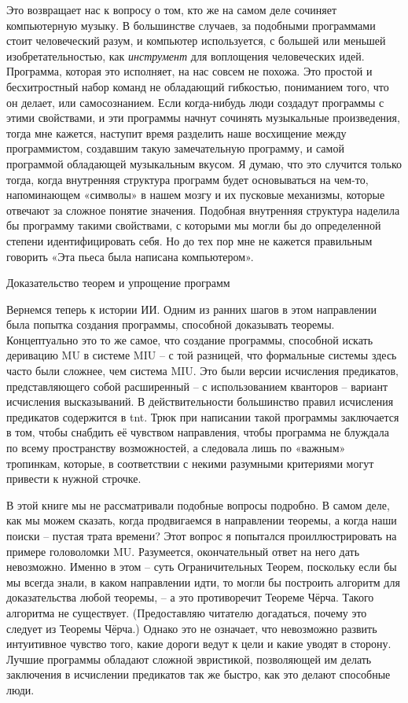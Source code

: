 \documentclass[../main.tex]{subfiles}
\begin{document}
Это возвращает нас к вопросу о том, кто же на самом деле сочиняет компьютерную музыку. В большинстве случаев, за подобными программами стоит человеческий разум, и компьютер используется, с большей или меньшей изобретательностью, как \emph{инструмент} для воплощения человеческих идей. Программа, которая это исполняет, на нас совсем не похожа. Это простой и бесхитростный набор команд не обладающий гибкостью, пониманием того, что он делает, или самосознанием. Если когда-нибудь люди создадут программы с этими свойствами, и эти программы начнут сочинять музыкальные произведения, тогда мне кажется, наступит время разделить наше восхищение между программистом, создавшим такую замечательную программу, и самой программой обладающей музыкальным вкусом. Я думаю, что это случится только тогда, когда внутренняя структура программ будет основываться на чем-то, напоминающем «символы» в нашем мозгу и их пусковые механизмы, которые отвечают за сложное понятие значения. Подобная внутренняя структура наделила бы программу такими свойствами, с которыми мы могли бы до определенной степени идентифицировать себя. Но до тех пор мне не кажется правильным говорить «Эта пьеса была написана компьютером».

Доказательство теорем и упрощение программ

Вернемся теперь к истории ИИ\@. Одним из ранних шагов в этом направлении была попытка создания программы, способной доказывать теоремы. Концептуально это то же самое, что создание программы, способной искать деривацию MU в системе MIU \--- с той разницей, что формальные системы здесь часто были сложнее, чем система MIU\@. Это были версии исчисления предикатов, представляющего собой расширенный \--- с использованием кванторов \--- вариант исчисления высказываний. В действительности большинство правил исчисления предикатов содержится в \acs{tnt}\@. Трюк при написании такой программы заключается в том, чтобы снабдить её чувством направления, чтобы программа не блуждала по всему пространству возможностей, а следовала лишь по «важным» тропинкам, которые, в соответствии с некими разумными критериями могут привести к нужной строчке.

В этой книге мы не рассматривали подобные вопросы подробно. В самом деле, как мы можем сказать, когда продвигаемся в направлении теоремы, а когда наши поиски \--- пустая трата времени? Этот вопрос я попытался проиллюстрировать на примере головоломки MU\@. Разумеется, окончательный ответ на него дать невозможно. Именно в этом \--- суть Ограничительных Теорем, поскольку если бы мы всегда знали, в каком направлении идти, то могли бы построить алгоритм для доказательства любой теоремы, \--- а это противоречит Теореме Чёрча. Такого алгоритма не существует. (Предоставляю читателю догадаться, почему это следует из Теоремы Чёрча.) Однако это не означает, что невозможно развить интуитивное чувство того, какие дороги ведут к цели и какие уводят в сторону. Лучшие программы обладают сложной эвристикой, позволяющей им делать заключения в исчислении предикатов так же быстро, как это делают способные люди.
\end{document}
